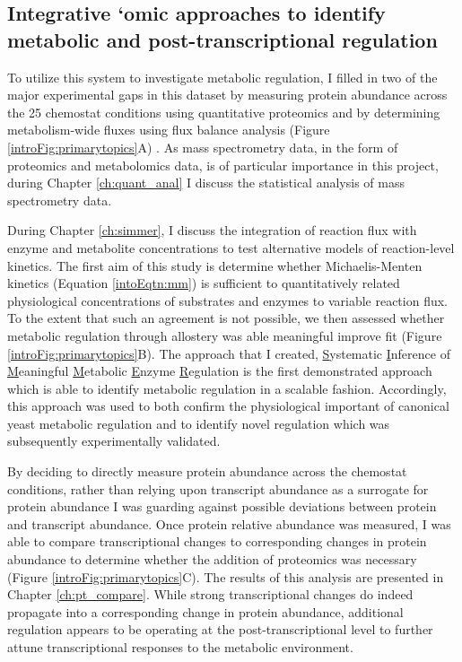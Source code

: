 \subsection{Integrative `omic approaches to identify metabolic and post-transcriptional regulation}

To utilize this system to investigate metabolic regulation, I filled in two of the major experimental gaps in this dataset by measuring protein abundance across the 25 chemostat conditions using quantitative proteomics and by determining metabolism-wide fluxes using flux balance analysis (Figure \ref{introFig:primarytopics}A) \cite{Orth:2010hb}. As mass spectrometry data, in the form of proteomics and metabolomics data, is of particular importance in this project, during Chapter \ref{ch:quant_anal} I discuss the statistical analysis of mass spectrometry data. 

During Chapter \ref{ch:simmer}, I discuss the integration of reaction flux with enzyme and metabolite concentrations to test alternative models of reaction-level kinetics. The first aim of this study is determine whether Michaelis-Menten kinetics (Equation \ref{intoEqtn:mm}) is sufficient to quantitatively related physiological concentrations of substrates and enzymes to variable reaction flux.  To the extent that such an agreement is not possible, we then assessed whether metabolic regulation through allostery was able meaningful improve fit (Figure \ref{introFig:primarytopics}B).  The approach that I created, \underline{S}ystematic \underline{I}nference of \underline{M}eaningful \underline{M}etabolic \underline{E}nzyme \underline{R}egulation is the first demonstrated approach which is able to identify metabolic regulation in a scalable fashion.  Accordingly, this approach was used to both confirm the physiological important of canonical yeast metabolic regulation and to identify novel regulation which was subsequently experimentally validated.

By deciding to directly measure protein abundance across the chemostat conditions, rather than relying upon transcript abundance as a surrogate for protein abundance I was guarding against possible deviations between protein and transcript abundance. Once protein relative abundance was measured, I was able to compare transcriptional changes to corresponding changes in protein abundance to determine whether the addition of proteomics was necessary (Figure \ref{introFig:primarytopics}C). The results of this analysis are presented in Chapter \ref{ch:pt_compare}.  While strong transcriptional changes do indeed propagate into a corresponding change in protein abundance, additional regulation appears to be operating at the post-transcriptional level to further attune transcriptional responses to the metabolic environment.

